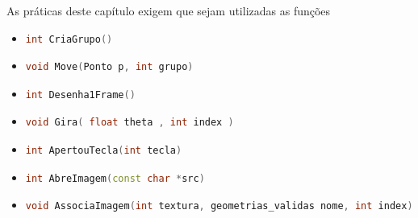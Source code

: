 As práticas deste capítulo exigem que sejam utilizadas as funções
\begin{itemize}
  \item 
    \begin{lstlisting}[language=C++]
    int CriaGrupo()
    \end{lstlisting}

  \item
    \begin{lstlisting}[language=C++]
    void Move(Ponto p, int grupo)
    \end{lstlisting}

  \item
    \begin{lstlisting}[language=C++]
    int Desenha1Frame()
    \end{lstlisting}

  \item
    \begin{lstlisting}[language=C++]
    void Gira( float theta , int index )
    \end{lstlisting}

  \item
    \begin{lstlisting}[language=C++]
    int ApertouTecla(int tecla)
    \end{lstlisting}

  \item
    \begin{lstlisting}[language=C++]
    int AbreImagem(const char *src)
    \end{lstlisting}

  \item
    \begin{lstlisting}[language=C++]
    void AssociaImagem(int textura, geometrias_validas nome, int index)
    
    \end{lstlisting}
 
\end{itemize}

